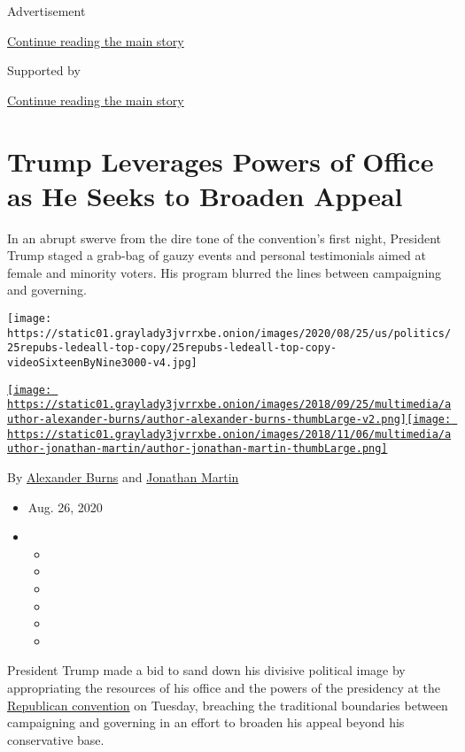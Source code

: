 Advertisement

\protect\hyperlink{after-top}{Continue reading the main story}

Supported by

\protect\hyperlink{after-sponsor}{Continue reading the main story}

\hypertarget{trump-leverages-powers-of-office-as-he-seeks-to-broaden-appeal}{%
\section{Trump Leverages Powers of Office as He Seeks to Broaden
Appeal}\label{trump-leverages-powers-of-office-as-he-seeks-to-broaden-appeal}}

In an abrupt swerve from the dire tone of the convention's first night,
President Trump staged a grab-bag of gauzy events and personal
testimonials aimed at female and minority voters. His program blurred
the lines between campaigning and governing.

\texttt{[image: https://static01.graylady3jvrrxbe.onion/images/2020/08/25/us/politics/25repubs-ledeall-top-copy/25repubs-ledeall-top-copy-videoSixteenByNine3000-v4.jpg]}

\href{https://www.nytimes3xbfgragh.onion/by/alexander-burns}{\texttt{[image: https://static01.graylady3jvrrxbe.onion/images/2018/09/25/multimedia/author-alexander-burns/author-alexander-burns-thumbLarge-v2.png]}}\href{https://www.nytimes3xbfgragh.onion/by/jonathan-martin}{\texttt{[image: https://static01.graylady3jvrrxbe.onion/images/2018/11/06/multimedia/author-jonathan-martin/author-jonathan-martin-thumbLarge.png]}}

By
\href{https://www.nytimes3xbfgragh.onion/by/alexander-burns}{Alexander
Burns} and
\href{https://www.nytimes3xbfgragh.onion/by/jonathan-martin}{Jonathan
Martin}

\begin{itemize}
\item
  Aug. 26, 2020
\item
  \begin{itemize}
  \item
  \item
  \item
  \item
  \item
  \item
  \end{itemize}
\end{itemize}

President Trump made a bid to sand down his divisive political image by
appropriating the resources of his office and the powers of the
presidency at the
\href{https://www.nytimes3xbfgragh.onion/live/2020/08/27/us/rnc-convention-election}{Republican
convention} on Tuesday, breaching the traditional boundaries between
campaigning and governing in an effort to broaden his appeal beyond his
conservative base.

